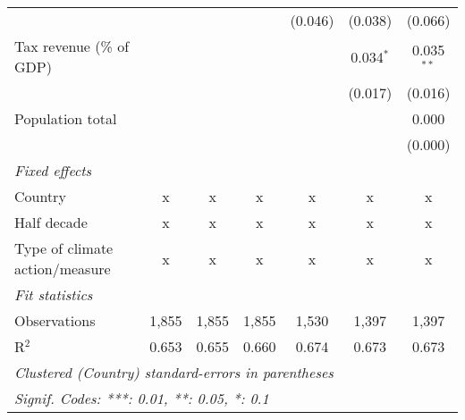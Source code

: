 \begin{tabular}{lcccccc}
                                                   &         &              &                & (0.046)        & (0.038)        & (0.066)\\   
   Tax revenue (\% of GDP)                         &         &              &                &                & 0.034$^{*}$    & 0.035$^{**}$\\   
                                                   &         &              &                &                & (0.017)        & (0.016)\\   
   Population total                                &         &              &                &                &                & 0.000\\   
                                                   &         &              &                &                &                & (0.000)\\   
   \emph{Fixed effects}\\
   Country                                         & x       & x            & x              & x              & x              & x\\  
   Half decade                                     & x       & x            & x              & x              & x              & x\\  
   Type of climate action/measure                  & x       & x            & x              & x              & x              & x\\  
   \midrule \emph{Fit statistics}\\
   Observations                                    & 1,855   & 1,855        & 1,855          & 1,530          & 1,397          & 1,397\\  
   R$^2$                                           & 0.653   & 0.655        & 0.660          & 0.674          & 0.673          & 0.673\\  
   \midrule
   \multicolumn{7}{l}{\emph{Clustered (Country) standard-errors in parentheses}}\\
   \multicolumn{7}{l}{\emph{Signif. Codes: ***: 0.01, **: 0.05, *: 0.1}}\\
\end{tabular}
\par\endgroup


